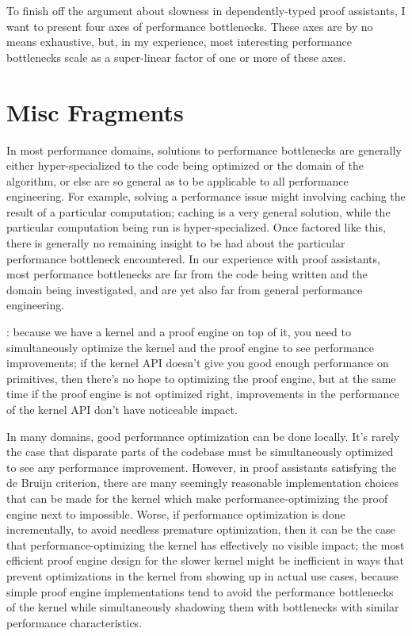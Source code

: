 
To finish off the argument about slowness in dependently-typed proof assistants, I want to present four axes of performance bottlenecks.
These axes are by no means exhaustive, but, in my experience, most interesting performance bottlenecks scale as a super-linear factor of one or more of these axes.

\section*{Misc Fragments}

In most performance domains, solutions to performance bottlenecks are generally either hyper-specialized to the code being optimized or the domain of the algorithm, or else are so general as to be applicable to all performance engineering.
For example, solving a performance issue might involving caching the result of a particular computation; caching is a very general solution, while the particular computation being run is hyper-specialized.
Once factored like this, there is generally no remaining insight to be had about the particular performance bottleneck encountered.
In our experience with proof assistants, most performance bottlenecks are far from the code being written and the domain being investigated, and are yet also far from general performance engineering.


:  because we have a kernel and a proof engine on top of it, you need to simultaneously optimize the kernel and the proof engine to see performance improvements; if the kernel API doesn't give you good enough performance on primitives, then there's no hope to optimizing the proof engine, but at the same time if the proof engine is not optimized right, improvements in the performance of the kernel API don't have noticeable impact.

In many domains, good performance optimization can be done locally.
It's rarely the case that disparate parts of the codebase must be simultaneously optimized to see any performance improvement.
However, in proof assistants satisfying the de Bruijn criterion, there are many seemingly reasonable implementation choices that can be made for the kernel which make performance-optimizing the proof engine next to impossible.
Worse, if performance optimization is done incrementally, to avoid needless premature optimization, then it can be the case that performance-optimizing the kernel has effectively no visible impact; the most efficient proof engine design for the slower kernel might be inefficient in ways that prevent optimizations in the kernel from showing up in actual use cases, because simple proof engine implementations tend to avoid the performance bottlenecks of the kernel while simultaneously shadowing them with bottlenecks with similar performance characteristics.

